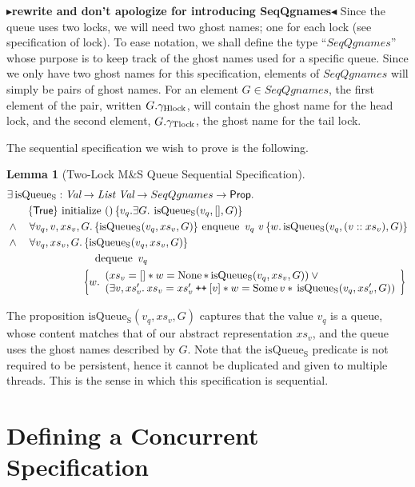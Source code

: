 \documentclass[a4paper, 10pt]{report}
\theoremstyle{definition}
\newtheorem{lemma}[theorem]{Lemma}
\newcommand{\initialise}{\operatorname{initialize}}
\newcommand{\enqueue}{\operatorname{enqueue}}
\newcommand{\dequeue}{\operatorname{dequeue}}
\newcommand{\msq}{M\&S Queue}
\newcommand{\tlmsq}{Two-Lock \msq{}}
\newcommand{\isqueueseq}{\operatorname{isQueue_{S}}}
\newcommand{\SeqQgnames}{SeqQgnames}
\newcommand{\vq}{v_q}
\newcommand{\nodeval}{\valB}
\newcommand{\absvalue}{\val}
\newcommand{\absvalueList}{xs_v}
\newcommand{\Qg}{G}
\newcommand{\ghlock}{\gname_{\mathrm{Hlock}}}
\newcommand{\gtlock}{\gname_{\mathrm{Tlock}}}
\newcommand\catenate{\mathbin{\text{\ttfamily\upshape ++}}}
\newcommand{\tlseqspecinitHTGen}[2]{\hoare{\TRUE}{\initialise \ \TT}{#1 . \Exists #2. \isqueueseq(#1, [], #2)}}
\newcommand{\tlseqspecinitGen}[2]{\tlseqspecinitHTGen{#1}{#2}}
\newcommand{\tlseqspecinit}{\tlseqspecinitGen{\vq}{\Qg}}
\newcommand{\tlseqspecenqHT}[4]{\hoare{\isqueueseq(#1, #3, #4)}{\enqueue \ #1 \ #2}{\valB . \isqueueseq(#1, (#2 :: #3), #4)}}
\newcommand{\tlseqspecenqGen}[4]{\All #1, #2, #3, #4. \tlseqspecenqHT{#1}{#2}{#3}{#4}}
\newcommand{\tlseqspecenq}{\tlseqspecenqGen{\vq}{\absvalue}{\absvalueList}{\Qg}}
\newcommand{\tlseqspecdeqHT}[3]{\hoareV[t]{\isqueueseq(#1, #2, #3)}{\dequeue \ #1}{\nodeval . \begin{array}{l}(#2 = [] \star{} \nodeval = \None \star{} \isqueueseq(#1, #2, #3)) \lor{}\\ (\Exists \absvalue, #2' . #2 = #2' \catenate [\absvalue] \star{} \nodeval = \Some \absvalue \star{} \isqueueseq(#1, #2', #3)) \end{array}}}
\newcommand{\tlseqspecdeqGen}[3]{\All #1, #2, #3. \tlseqspecdeqHT{#1}{#2}{#3}}
\newcommand{\tlseqspecdeq}{\tlseqspecdeqGen{\vq}{\absvalueList}{\Qg}}
\newcommand{\todo}[1]{{\color[rgb]{.5,0,0}\textbf{$\blacktriangleright$#1$\blacktriangleleft$}}}
\begin{document}
\todo{rewrite and don't apologize for introducing SeqQgnames}
Since the queue uses two locks, we will need two ghost names; one for each lock (see specification of lock). To ease notation, we shall define the type ``$\SeqQgnames$'' whose purpose is to keep track of the ghost names used for a specific queue. Since we only have two ghost names for this specification, elements of $\SeqQgnames$ will simply be pairs of ghost names. For an element $\Qg \in \SeqQgnames$, the first element of the pair, written $\Qg.\ghlock$, will contain the ghost name for the head lock, and the second element, $\Qg.\gtlock$, the ghost name for the tail lock.

The sequential specification we wish to prove is the following.
\begin{lemma}[\tlmsq{} Sequential Specification]\label{TLMSQ:spec:seq}
\begin{align*}
  &\Exists \isqueueseq : \Val \to \List ~ \Val \to \SeqQgnames \to \Prop.\\
  &\quad\quad\tlseqspecinit\\
  &\land{}\quad\tlseqspecenq\\
  &\land{}\quad\tlseqspecdeq
\end{align*}
\end{lemma}

The proposition $\isqueueseq(\vq, \absvalueList, \Qg)$ captures that the value $\vq$ is a queue, whose content matches that of our abstract representation $\absvalueList$, and the queue uses the ghost names described by $\Qg$. Note that the $\isqueueseq$ predicate is not required to be persistent, hence it cannot be duplicated and given to multiple threads. This is the sense in which this specification is sequential.

\section{Defining a Concurrent Specification}
\label{QueueSpecs:section:conc}
\end{document}
